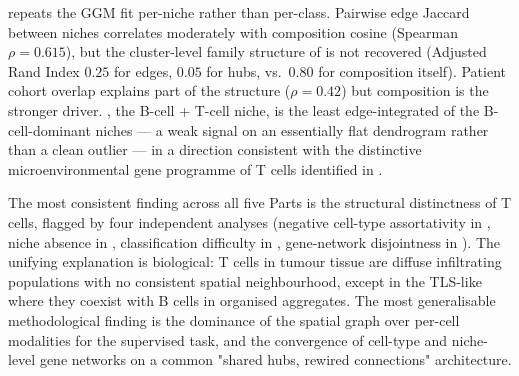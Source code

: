  repeats the GGM fit per-niche rather than per-class. Pairwise edge Jaccard between niches correlates moderately with composition cosine (Spearman $\rho = 0.615$), but the cluster-level family structure of  is not recovered (Adjusted Rand Index $0.25$ for edges, $0.05$ for hubs, vs.\ $0.80$ for composition itself). Patient cohort overlap explains part of the structure ($\rho = 0.42$) but composition is the stronger driver. , the B-cell + T-cell niche, is the least edge-integrated of the B-cell-dominant niches --- a weak signal on an essentially flat dendrogram rather than a clean outlier --- in a direction consistent with the distinctive microenvironmental gene programme of T cells identified in .

The most consistent finding across all five Parts is the structural distinctness of T cells, flagged by four independent analyses (negative cell-type assortativity in , niche absence in , classification difficulty in , gene-network disjointness in ). The unifying explanation is biological: T cells in tumour tissue are diffuse infiltrating populations with no consistent spatial neighbourhood, except in the TLS-like  where they coexist with B cells in organised aggregates. The most generalisable methodological finding is the dominance of the spatial graph over per-cell modalities for the supervised task, and the convergence of cell-type and niche-level gene networks on a common "shared hubs, rewired connections" architecture.